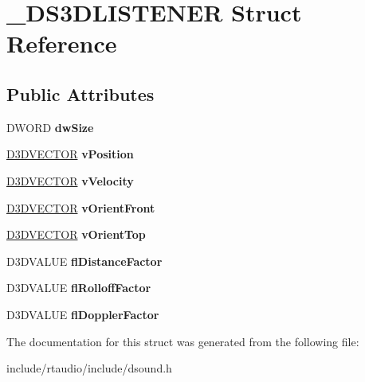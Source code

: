 \hypertarget{struct___d_s3_d_l_i_s_t_e_n_e_r}{}\section{\+\_\+\+D\+S3\+D\+L\+I\+S\+T\+E\+N\+ER Struct Reference}
\label{struct___d_s3_d_l_i_s_t_e_n_e_r}
\subsection*{Public Attributes}
\begin{DoxyCompactItemize}
\item 
D\+W\+O\+RD {\bfseries dw\+Size}\hypertarget{struct___d_s3_d_l_i_s_t_e_n_e_r_a32d153579c8d29c7c68b0ab997fd0629}{}\label{struct___d_s3_d_l_i_s_t_e_n_e_r_a32d153579c8d29c7c68b0ab997fd0629}

\item 
\hyperlink{struct___d3_d_v_e_c_t_o_r}{D3\+D\+V\+E\+C\+T\+OR} {\bfseries v\+Position}\hypertarget{struct___d_s3_d_l_i_s_t_e_n_e_r_ac88ff0305e916409bed21506da13a99d}{}\label{struct___d_s3_d_l_i_s_t_e_n_e_r_ac88ff0305e916409bed21506da13a99d}

\item 
\hyperlink{struct___d3_d_v_e_c_t_o_r}{D3\+D\+V\+E\+C\+T\+OR} {\bfseries v\+Velocity}\hypertarget{struct___d_s3_d_l_i_s_t_e_n_e_r_a4ebf7c607c8195c895a22f8c8c84cbfd}{}\label{struct___d_s3_d_l_i_s_t_e_n_e_r_a4ebf7c607c8195c895a22f8c8c84cbfd}

\item 
\hyperlink{struct___d3_d_v_e_c_t_o_r}{D3\+D\+V\+E\+C\+T\+OR} {\bfseries v\+Orient\+Front}\hypertarget{struct___d_s3_d_l_i_s_t_e_n_e_r_ae67e07db8303f24b60cf24eb0e365222}{}\label{struct___d_s3_d_l_i_s_t_e_n_e_r_ae67e07db8303f24b60cf24eb0e365222}

\item 
\hyperlink{struct___d3_d_v_e_c_t_o_r}{D3\+D\+V\+E\+C\+T\+OR} {\bfseries v\+Orient\+Top}\hypertarget{struct___d_s3_d_l_i_s_t_e_n_e_r_a237765de15f0a79654b87c80abd206fe}{}\label{struct___d_s3_d_l_i_s_t_e_n_e_r_a237765de15f0a79654b87c80abd206fe}

\item 
D3\+D\+V\+A\+L\+UE {\bfseries fl\+Distance\+Factor}\hypertarget{struct___d_s3_d_l_i_s_t_e_n_e_r_a9262aa7e1e613bbca208bea26c2de22b}{}\label{struct___d_s3_d_l_i_s_t_e_n_e_r_a9262aa7e1e613bbca208bea26c2de22b}

\item 
D3\+D\+V\+A\+L\+UE {\bfseries fl\+Rolloff\+Factor}\hypertarget{struct___d_s3_d_l_i_s_t_e_n_e_r_a6e9664933efc10cf7a02d7699c935da6}{}\label{struct___d_s3_d_l_i_s_t_e_n_e_r_a6e9664933efc10cf7a02d7699c935da6}

\item 
D3\+D\+V\+A\+L\+UE {\bfseries fl\+Doppler\+Factor}\hypertarget{struct___d_s3_d_l_i_s_t_e_n_e_r_a352554d04e078f09775ced09ee585958}{}\label{struct___d_s3_d_l_i_s_t_e_n_e_r_a352554d04e078f09775ced09ee585958}

\end{DoxyCompactItemize}


The documentation for this struct was generated from the following file\+:\begin{DoxyCompactItemize}
\item 
include/rtaudio/include/dsound.\+h\end{DoxyCompactItemize}
